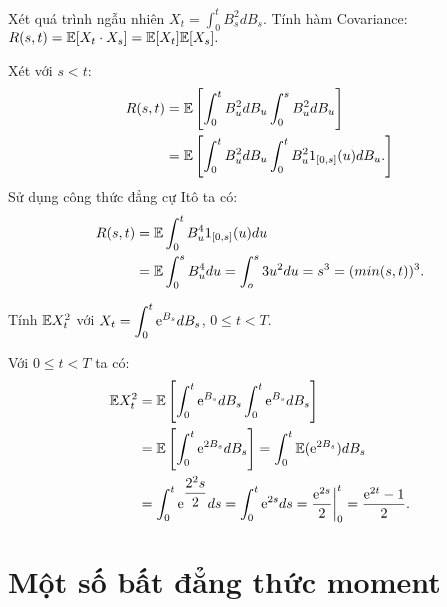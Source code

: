 \begin{exam*}
Xét quá trình ngẫu nhiên $X_t = \displaystyle \int_0^t B_s^2 dB_s$. Tính hàm Covariance: $R(s,t)=\mathbb{E}[X_t \cdot X_s] = \mathbb{E}[X_t]\mathbb{E}[X_s]. $
\begin{sol*}
    Xét với $s<t$:
    \begin{align*}
        R(s,t) &= \mathbb{E} \left[\displaystyle \int_0^t B_u^2 dB_u\displaystyle \int_0^s B_u^2 dB_u  \right]\\
        &= \mathbb{E} \left[\displaystyle \int_0^t B_u^2 dB_u\displaystyle \int_0^t B_u^2 1_{[0,s]}(u) dB_u.\right]
    \end{align*}
    Sử dụng công thức đẳng cự Itô ta có:
    \begin{align*}
         R(s,t) &= \mathbb{E} \displaystyle \int_0^t B_u^4 1_{[0,s]}(u) du\\
         & = \mathbb{E} \displaystyle \int_0^s B_u^4 du = \displaystyle \int_o^s 3u^2 du = s^3 = (min(s,t))^3.
    \end{align*}
\end{sol*}
\end{exam*}
\begin{exam*}
Tính $\mathbb{E} X_t^2$ với $X_t =\displaystyle \int_0^t \mathrm{e}^{B_s} dB_s$, $ 0\leq t <T .$
\begin{sol*}
Với $0\leq t <T$ ta có:
    \begin{align*}
        \mathbb{E} X_t^2 &= \mathbb{E} \left[\displaystyle \int_0^t \mathrm{e}^{B_s} dB_s \displaystyle \int_0^t \mathrm{e}^{B_s} dB_s  \right]\\
        &= \mathbb{E} \left[\displaystyle \int_0^t \mathrm{e}^{2B_s} dB_s  \right] = \displaystyle \int_0^t \mathbb{E} (\mathrm{e}^{2B_s}) dB_s  \\
        &= \displaystyle \int_0^t \mathrm{e}^{\dfrac{2^2 s}{2}} ds = \displaystyle \int_0^t \mathrm{e}^{2s} ds = \dfrac{\mathrm{e}^{2s}}{2} \bigg|_0^t  = \dfrac{\mathrm{e}^{2t}-1}{2}.   
    \end{align*}
\end{sol*}
\end{exam*}
\section{Một số bất đẳng thức moment}
